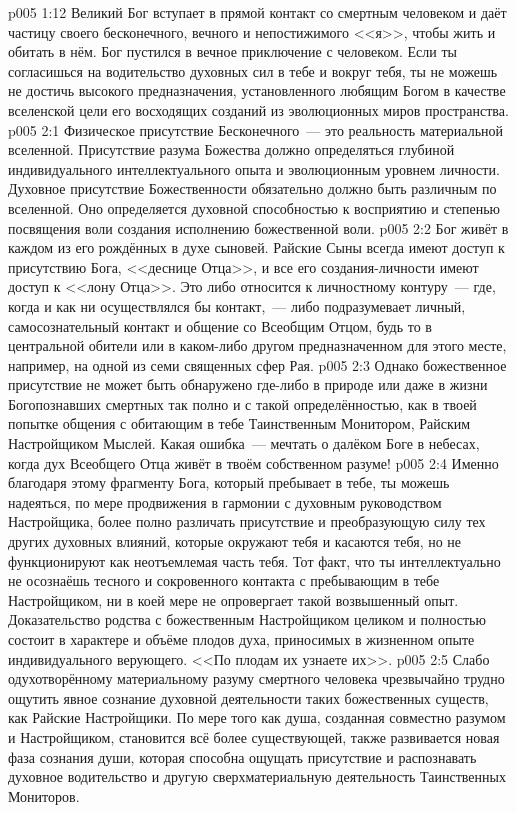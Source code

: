 \vs p005 1:12 Великий Бог вступает в прямой контакт со смертным человеком и даёт частицу своего бесконечного, вечного и непостижимого <<я>>, чтобы жить и обитать в нём. Бог пустился в вечное приключение с человеком. Если ты согласишься на водительство духовных сил в тебе и вокруг тебя, ты не можешь не достичь высокого предназначения, установленного любящим Богом в качестве вселенской цели его восходящих созданий из эволюционных миров пространства.
\vs p005 2:1 Физическое присутствие Бесконечного~--- это реальность материальной вселенной. Присутствие разума Божества должно определяться глубиной индивидуального интеллектуального опыта и эволюционным уровнем личности. Духовное присутствие Божественности обязательно должно быть различным по вселенной. Оно определяется духовной способностью к восприятию и степенью посвящения воли создания исполнению божественной воли.
\vs p005 2:2 Бог живёт в каждом из его рождённых в духе сыновей. Райские Сыны всегда имеют доступ к присутствию Бога, <<деснице Отца>>, и все его создания\hyp{}личности имеют доступ к <<лону Отца>>. Это либо относится к личностному контуру~--- где, когда и как ни осуществлялся бы контакт,~--- либо подразумевает личный, самосознательный контакт и общение со Всеобщим Отцом, будь то в центральной обители или в каком\hyp{}либо другом предназначенном для этого месте, например, на одной из семи священных сфер Рая.
\vs p005 2:3 Однако божественное присутствие не может быть обнаружено где\hyp{}либо в природе или даже в жизни Богопознавших смертных так полно и с такой определённостью, как в твоей попытке общения с обитающим в тебе Таинственным Монитором, Райским Настройщиком Мыслей. Какая ошибка~--- мечтать о далёком Боге в небесах, когда дух Всеобщего Отца живёт в твоём собственном разуме!
\vs p005 2:4 \pc Именно благодаря этому фрагменту Бога, который пребывает в тебе, ты можешь надеяться, по мере продвижения в гармонии с духовным руководством Настройщика, более полно различать присутствие и преобразующую силу тех других духовных влияний, которые окружают тебя и касаются тебя, но не функционируют как неотъемлемая часть тебя. Тот факт, что ты интеллектуально не осознаёшь тесного и сокровенного контакта с пребывающим в тебе Настройщиком, ни в коей мере не опровергает такой возвышенный опыт. Доказательство родства с божественным Настройщиком целиком и полностью состоит в характере и объёме плодов духа, приносимых в жизненном опыте индивидуального верующего. <<По плодам их узнаете их>>.
\vs p005 2:5 Слабо одухотворённому материальному разуму смертного человека чрезвычайно трудно ощутить явное сознание духовной деятельности таких божественных существ, как Райские Настройщики. По мере того как душа, созданная совместно разумом и Настройщиком, становится всё более существующей, также развивается новая фаза сознания души, которая способна ощущать присутствие и распознавать духовное водительство и другую сверхматериальную деятельность Таинственных Мониторов.
